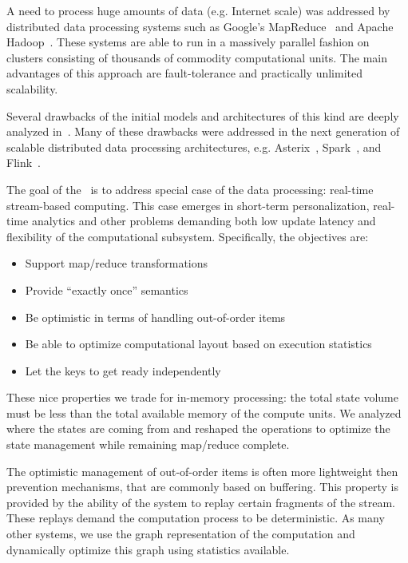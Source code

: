 
\label {fs-intro-seciton}

A need to process huge amounts of data (e.g. Internet scale) was addressed by distributed data processing systems such as Google's MapReduce~\cite{Dean:2008:MSD:1327452.1327492} and Apache Hadoop~\cite{hadoop2009hadoop}. These systems are able to run in a massively parallel fashion on clusters consisting of thousands of commodity computational units. The main advantages of this approach are fault-tolerance and practically unlimited scalability.

Several drawbacks of the initial models and architectures of this kind are deeply analyzed in~\cite{Doulkeridis:2014:SLA:2628707.2628782}. Many of these drawbacks were addressed in the next generation of scalable distributed data processing architectures, e.g. Asterix~\cite{Alsubaiee:2012:ASW:2331801.2331803}, Spark~\cite{Zaharia:2016:ASU:3013530.2934664}, 
and Flink~\cite{carbone2015apache}. 

The goal of the \FlameStream\ is to address special case of the data processing: real-time stream-based computing. This case emerges in short-term personalization, real-time analytics and other problems demanding both low update latency and flexibility of the computational subsystem. Specifically, the objectives are:

\begin {itemize}
\item Support map/reduce transformations
\item Provide ``exactly once'' semantics
\item Be optimistic in terms of handling out-of-order items
\item Be able to optimize computational layout based on execution statistics
\item Let the keys to get ready independently
\end {itemize}

These nice properties we trade for in-memory processing: the total state volume must be less than the total available memory of the compute units. We analyzed where the states are coming from and reshaped the operations to optimize the state management while remaining map/reduce complete. 

The optimistic management of out-of-order items is often more lightweight then prevention mechanisms, that are commonly based on buffering. This property is provided by the ability of the system to replay certain fragments of the stream. These replays demand the computation process to be deterministic. As many other systems, we use the graph representation of the computation and dynamically optimize this graph using statistics available. 

